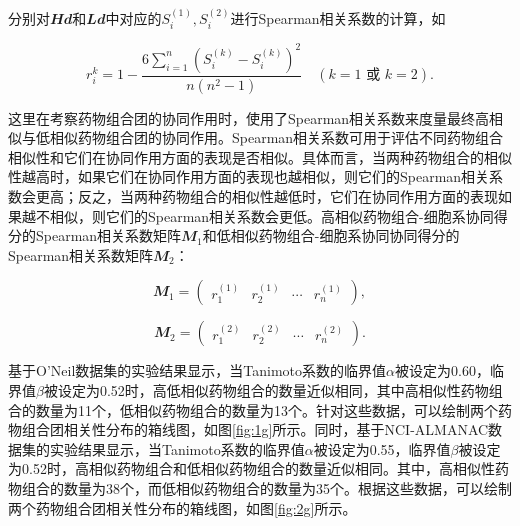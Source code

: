 \noindent 分别对$\mathbfit{Hd}$和$\mathbfit{Ld}$中对应的$S_i^{(1)}, S_i^{(2)}$进行Spearman相关系数的计算，如


\begin{equation}
r_i^k=1-\frac{6\sum_{i=1}^n(S_i^{(k)}-S_i^{(k)})^2}{n(n^2-1)} \quad (k=1 \text{ 或 } k=2).
\label{eq:sp}
\end{equation}

这里在考察药物组合团的协同作用时，使用了Spearman相关系数\supercite{24}来度量最终高相似与低相似药物组合团的协同作用。Spearman相关系数可用于评估不同药物组合相似性和它们在协同作用方面的表现是否相似。具体而言，当两种药物组合的相似性越高时，如果它们在协同作用方面的表现也越相似，则它们的Spearman相关系数会更高；反之，当两种药物组合的相似性越低时，它们在协同作用方面的表现如果越不相似，则它们的Spearman相关系数会更低。高相似药物组合-细胞系协同得分的Spearman相关系数矩阵$\mathbfit{M_1}$和低相似药物组合-细胞系协同协同得分的Spearman相关系数矩阵$\mathbfit{M_2}$：

\vspace{-1em}

\begin{equation*}
\mathbfit{M_1} = \begin{pmatrix} r_1^{(1)} & r_2^{(1)} & \cdots & r_n^{(1)} \end{pmatrix}, 
\end{equation*}

\vspace{-1em}

\begin{equation*}
\mathbfit{M_2} = \begin{pmatrix} r_1^{(2)} & r_2^{(2)} & \cdots & r_n^{(2)} \end{pmatrix}.
\end{equation*}

基于O'Neil数据集的实验结果显示，当Tanimoto系数的临界值$α$被设定为0.60，临界值$β$被设定为0.52时，高低相似药物组合的数量近似相同，其中高相似性药物组合的数量为11个，低相似药物组合的数量为13个。针对这些数据，可以绘制两个药物组合团相关性分布的箱线图，如图\ref{fig:1g}所示。同时，基于NCI-ALMANAC数据集的实验结果显示，当Tanimoto系数的临界值$α$被设定为0.55，临界值$β$被设定为0.52时，高相似药物组合和低相似药物组合的数量近似相同。其中，高相似性药物组合的数量为38个，而低相似药物组合的数量为35个。根据这些数据，可以绘制两个药物组合团相关性分布的箱线图，如图\ref{fig:2g}所示。

